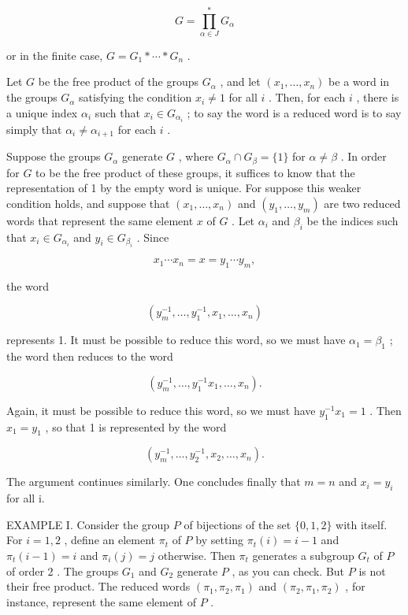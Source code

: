 \documentclass[10pt]{article}
\begin{document}
\[
G = \mathop{\prod }\limits_{{\alpha  \in  J}}^{ * }{G}_{\alpha }
\]

or in the finite case, \(G = {G}_{1} * \cdots  * {G}_{n}\) .

Let \(G\) be the free product of the groups \({G}_{\alpha }\) , and let \(\left( {{x}_{1},\ldots ,{x}_{n}}\right)\) be a word in the groups \({G}_{\alpha }\) satisfying the condition \({x}_{i} \neq  1\) for all \(i\) . Then, for each \(i\) , there is a unique index \({\alpha }_{i}\) such that \({x}_{i} \in  {G}_{{\alpha }_{i}}\) ; to say the word is a reduced word is to say simply that \({\alpha }_{i} \neq  {\alpha }_{i + 1}\) for each \(i\) .

Suppose the groups \({G}_{\alpha }\) generate \(G\) , where \({G}_{\alpha } \cap  {G}_{\beta } = \{ 1\}\) for \(\alpha  \neq  \beta\) . In order for \(G\) to be the free product of these groups, it suffices to know that the representation of 1 by the empty word is unique. For suppose this weaker condition holds, and suppose that \(\left( {{x}_{1},\ldots ,{x}_{n}}\right)\) and \(\left( {{y}_{1},\ldots ,{y}_{m}}\right)\) are two reduced words that represent the same element \(x\) of \(G\) . Let \({\alpha }_{i}\) and \({\beta }_{i}\) be the indices such that \({x}_{i} \in  {G}_{{\alpha }_{i}}\) and \({y}_{i} \in  {G}_{{\beta }_{i}}\) . Since

\[
{x}_{1}\cdots {x}_{n} = x = {y}_{1}\cdots {y}_{m},
\]

the word

\[
\left( {{y}_{m}^{-1},\ldots ,{y}_{1}^{-1},{x}_{1},\ldots ,{x}_{n}}\right)
\]

represents 1. It must be possible to reduce this word, so we must have \({\alpha }_{1} = {\beta }_{1}\) ; the word then reduces to the word

\[
\left( {{y}_{m}^{-1},\ldots ,{y}_{1}^{-1}{x}_{1},\ldots ,{x}_{n}}\right) .
\]

Again, it must be possible to reduce this word, so we must have \({y}_{1}^{-1}{x}_{1} = 1\) . Then \({x}_{1} = {y}_{1}\) , so that 1 is represented by the word

\[
\left( {{y}_{m}^{-1},\ldots ,{y}_{2}^{-1},{x}_{2},\ldots ,{x}_{n}}\right) .
\]

The argument continues similarly. One concludes finally that \(m = n\) and \({x}_{i} = {y}_{i}\) for all i.

EXAMPLE I. Consider the group \(P\) of bijections of the set \(\{ 0,1,2\}\) with itself. For \(i = 1,2\) , define an element \({\pi }_{t}\) of \(P\) by setting \({\pi }_{t}\left( i\right)  = i - 1\) and \({\pi }_{t}\left( {i - 1}\right)  = i\) and \({\pi }_{i}\left( j\right)  = j\) otherwise. Then \({\pi }_{t}\) generates a subgroup \({G}_{t}\) of \(P\) of order 2 . The groups \({G}_{1}\) and \({G}_{2}\) generate \(P\) , as you can check. But \(P\) is not their free product. The reduced words \(\left( {{\pi }_{1},{\pi }_{2},{\pi }_{1}}\right)\) and \(\left( {{\pi }_{2},{\pi }_{1},{\pi }_{2}}\right)\) , for instance, represent the same element of \(P\) .
\end{document}
